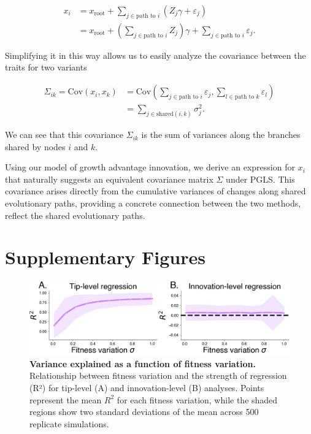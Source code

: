 \begin{align*}
    x_i &= x_{\text{root}} + \sum_{j \in \text{path to } i} (Z_j \gamma + \varepsilon_j)\\
	&= x_{\text{root}} + \left( \sum_{j \in \text{path to } i} Z_j \right) \gamma + \sum_{j \in \text{path to } i} \varepsilon_j.
\end{align*}

Simplifying it in this way allows us to easily analyze the covariance between the traits for two variants

\begin{align*}
    \Sigma_{ik} = \text{Cov}(x_i, x_k) &= \text{Cov} \left( \sum_{j \in \text{path to } i} \varepsilon_j, \sum_{l \in \text{path to } k} \varepsilon_l \right)\\
		&= \sum_{j \in \text{shared}(i, k)} \sigma_j^2.
\end{align*}

We can see that this covariance $\Sigma_{ik}$ is the sum of variances along the branches shared by nodes $i$ and $k$. 

Using our model of growth advantage innovation, we derive an expression for $x_i$ that naturally suggests an equivalent covariance matrix $\Sigma$ under PGLS.
This covariance arises directly from the cumulative variances of changes along shared evolutionary paths, providing a concrete connection between the two methods, reflect the shared evolutionary paths.


\section{Supplementary Figures}

\begin{figure}[h]
	\centering
	\includegraphics[width=1.0\textwidth]{./supplementary_figures/synthetic-fitness-variation-correlation.png}
	\caption{\textbf{Variance explained as a function of fitness variation.}
	    Relationship between fitness variation and the strength of regression (R²) for tip-level (A) and innovation-level (B) analyses.
	    Points represent the mean $R^2$ for each fitness variation, while the shaded regions show two standard deviations of the mean across 500 replicate simulations.
	}
	\label{fig:fitness-variation-variance-explained}
\end{figure}

